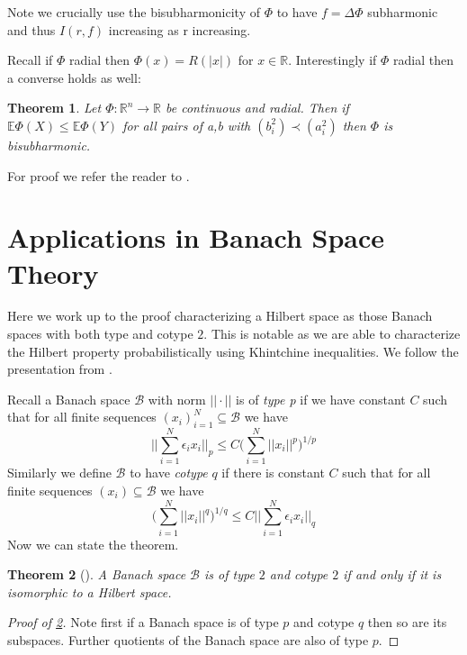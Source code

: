 \documentclass[10pt]{article}
\newcommand{\E}{\mathbb{E}}
\newcommand{\1}{\textbf{1}}
\newcommand{\R}{\mathbb{R}}
\newcommand{\norm}[1]{||#1||}
\newtheorem{theorem}{Theorem}
\theoremstyle{remark}
\theoremstyle{definition}
\begin{document}
Note we crucially use the bisubharmonicity of $\Phi$ to have $f = \Delta \Phi$ subharmonic and thus $I(r,f)$ increasing as r increasing. 

Recall if $\Phi$ radial then $\Phi(x) = R(|x|)$ for $x \in \R$. Interestingly if $\Phi$ radial then a converse holds as well:

\begin{theorem}
	Let $\Phi : \R^n \to \R$ be continuous and radial. Then if $\E \Phi(X) \leq \E \Phi(Y)$ for all pairs of a,b with $(b_i^2) \prec (a_i^2)$ then $\Phi$ is bisubharmonic.
\end{theorem}

For proof we refer the reader to \cite{BC}.

\section{Applications in Banach Space Theory}

Here we work up to the proof characterizing a Hilbert space as those Banach spaces with both type and cotype $2$. This is notable as we are able to characterize the Hilbert property probabilistically using Khintchine inequalities.  We follow the presentation from \cite{LT}.

Recall a Banach space $\mathcal{B}$ with norm $\norm{\cdot}$ is of \textit{type p} if we have constant $C$ such that for all finite sequences $(x_i)_{i=1}^N \subseteq \mathcal{B}$ we have
\begin{equation*}
	\norm{\sum_{i=1}^N \epsilon_ix_i}_p \leq C \lparen\sum_{i=1}^N \norm{x_i}^p\rparen^{1/p}
\end{equation*} Similarly we define $\mathcal{B}$ to have \textit{cotype} $q$ if there is constant $C$ such that for all finite sequences $(x_i) \subseteq \mathcal{B}$ we have
\begin{equation*}
	\lparen \sum_{i=1}^N \norm{x_i}^q\rparen^{1/q} \leq C \norm{\sum_{i=1}^N \epsilon_i x_i}_q
\end{equation*} Now we can state the theorem.

\begin{theorem}[\cite{LT}]\label{thm:App1}
	A Banach space $\mathcal{B}$ is of type $2$ and cotype $2$ if and only if it is isomorphic to a Hilbert space.
\end{theorem}

\begin{proof}[Proof of \ref{thm:App1}]
	Note first if a Banach space is of type $p$ and cotype $q$ then so are its subspaces. Further quotients of the Banach space are also of type $p$. 
\end{proof}
\end{document}
